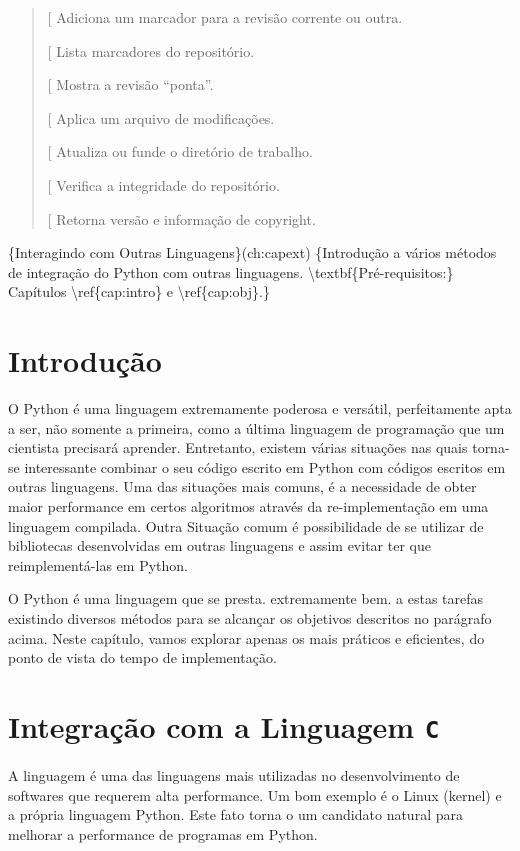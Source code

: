 \documentclass[a4paper,10pt,portuguese]{sphinxmanual}
\begin{document}
\begin{quote}
{[}\code{tag}{]} Adiciona um marcador para a revisão corrente ou outra.

{[}\code{tags}{]} Lista marcadores do repositório.

{[}\code{tip}{]} Mostra a revisão ``ponta''.

{[}\code{unbundle}{]} Aplica um arquivo de modificações.

{[}\code{update}{]} Atualiza ou funde o diretório de trabalho.

{[}\code{verify}{]} Verifica a integridade do repositório.

{[}\code{version}{]} Retorna versão e informação de copyright.
\end{quote}

\{Interagindo com Outras Linguagens\}(ch:capext)
\{Introdução a vários métodos de integração do Python com outras linguagens. \textbackslash{}textbf\{Pré-requisitos:\} Capítulos \textbackslash{}ref\{cap:intro\} e \textbackslash{}ref\{cap:obj\}.\}


\chapter{Introdução}
\label{capext:introducao}\label{capext::doc}
O Python é uma linguagem extremamente poderosa e versátil,
perfeitamente apta a ser, não somente a primeira, como a última
linguagem de programação que um cientista precisará aprender.
Entretanto, existem várias situações nas quais torna-se
interessante combinar o seu código escrito em Python com códigos
escritos em outras linguagens. Uma das situações mais comuns, é a
necessidade de obter maior performance em certos algoritmos através
da re-implementação em uma linguagem compilada. Outra Situação
comum é possibilidade de se utilizar de bibliotecas desenvolvidas
em outras linguagens e assim evitar ter que reimplementá-las em
Python.

O Python é uma linguagem que se presta. extremamente bem. a estas
tarefas existindo diversos métodos para se alcançar os objetivos
descritos no parágrafo acima. Neste capítulo, vamos explorar apenas
os mais práticos e eficientes, do ponto de vista do tempo de
implementação.


\chapter{Integração com a Linguagem \texttt{C}}
\label{capext:integracao-com-a-linguagem-c}
A linguagem  é uma das linguagens mais utilizadas no
desenvolvimento de softwares que requerem alta performance. Um bom
exemplo é o Linux (kernel) e a própria linguagem Python. Este fato
torna o  um candidato natural para melhorar a performance de
programas em Python.
\end{document}
